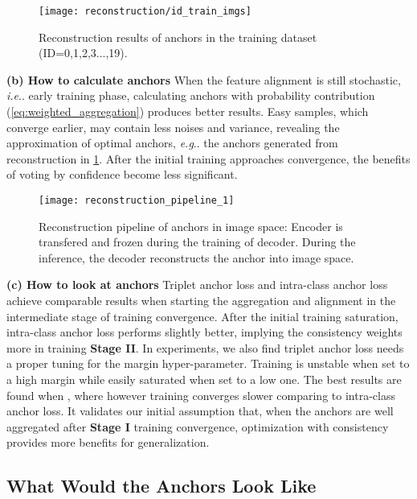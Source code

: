 \documentclass[runningheads]{llncs}
\makeatletter
\DeclareRobustCommand\onedot{\futurelet\@let@token\@onedot}
\def\@onedot{\ifx\@let@token.\else.\null\fi\xspace}
\def\eg{\emph{e.g}\onedot} \def\Eg{\emph{E.g}\onedot}
\def\ie{\emph{i.e}\onedot} \def\Ie{\emph{I.e}\onedot}
\makeatother
\begin{document}
\begin{figure}[!b]
    \centering
\texttt{[image: reconstruction/id\_train\_imgs]}
    \vspace*{-0.38cm}
    \caption{Reconstruction results of anchors in the training dataset (ID={0,1,2,3...,19}).}
    \label{fig:recon-anchor}
\end{figure}

\noindent\textbf{(b) How to calculate anchors} When the feature alignment is still stochastic, \ie early training phase, calculating anchors with probability contribution (\cref{eq:weighted_aggregation}) produces better results.
Easy samples, which converge earlier, may contain less noises and variance, revealing the approximation of optimal anchors, \eg the anchors generated from reconstruction in \cref{fig:recon-anchor}.
After the initial training approaches convergence, the benefits of voting by confidence become less significant.

\begin{figure}[t]
    \vspace*{-0.38cm}
    \centering
\texttt{[image: reconstruction\_pipeline\_1]}
    \caption{Reconstruction pipeline of anchors in image space: Encoder is transfered and frozen during the training of decoder. During the inference, the decoder reconstructs the anchor into image space.}
    \label{fig:recon-pipeline}
\end{figure}

\noindent\textbf{(c) How to look at anchors} Triplet anchor loss and intra-class anchor loss achieve comparable results when starting the aggregation and alignment in the intermediate stage of training convergence.
After the initial training saturation, intra-class anchor loss performs slightly better, implying the consistency weights more in training \textbf{Stage II}.
In experiments, we also find triplet anchor loss needs a proper tuning for the margin hyper-parameter.
Training is unstable when set to a high margin while easily saturated when set to a low one.
The best results are found when , where however training converges slower comparing to intra-class anchor loss.
It validates our initial assumption that, when the anchors are well aggregated after \textbf{Stage I} training convergence, optimization with consistency provides more benefits for generalization.


\vspace*{-0.18cm}
\subsection{What Would the Anchors Look Like}
\end{document}
